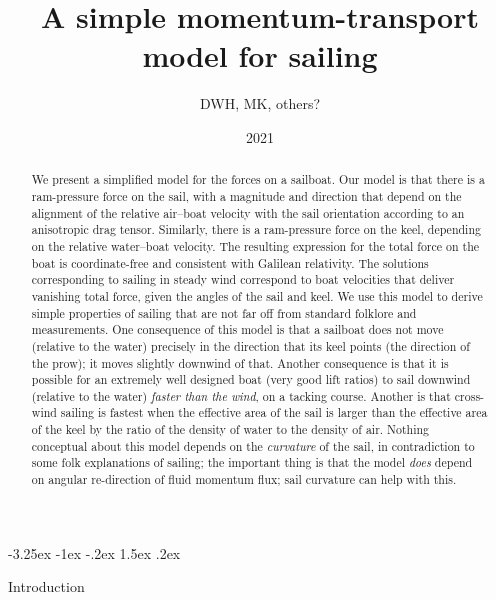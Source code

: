 \documentclass[letterpaper]{article}
\title{\bfseries%
A simple momentum-transport model for sailing}
\author{DWH, MK, others?}
\date{2021}
\makeatletter
\renewcommand\section{\@startsection {section}{1}{\z@}%
  {-3.25ex \@plus -1ex \@minus -.2ex}%
  {1.5ex \@plus .2ex}%
  {\raggedright\normalfont\large\bfseries}}
\makeatother
\begin{document}
\maketitle

\begin{abstract}\noindent
    We present a simplified model for the forces on a sailboat.
    Our model is that there is a ram-pressure force on the sail, with a magnitude and direction that depend on the alignment of the relative air--boat velocity with the sail orientation according to an anisotropic drag tensor.
    Similarly, there is a ram-pressure force on the keel, depending on the relative water--boat velocity.
    The resulting expression for the total force on the boat is coordinate-free and consistent with Galilean relativity.
    The solutions corresponding to sailing in steady wind correspond to boat velocities that deliver vanishing total force, given the angles of the sail and keel.
    We use this model to derive simple properties of sailing that are not far off from standard folklore and measurements.
    One consequence of this model is that a sailboat does not move (relative to the water) precisely in the direction that its keel points (the direction of the prow); it moves slightly downwind of that.
    Another consequence is that it is possible for an extremely well designed boat (very good lift ratios) to sail downwind (relative to the water) \emph{faster than the wind}, on a tacking course.
    Another is that cross-wind sailing is fastest when the effective area of the sail is larger than the effective area of the keel by the ratio of the density of water to the density of air.
    Nothing conceptual about this model depends on the \emph{curvature} of the sail, in contradiction to some folk explanations of sailing; the important thing is that the model \emph{does} depend on angular re-direction of fluid momentum flux; sail curvature can help with this.
\end{abstract}

\section{Introduction}\label{sec:intro}
\end{document}
